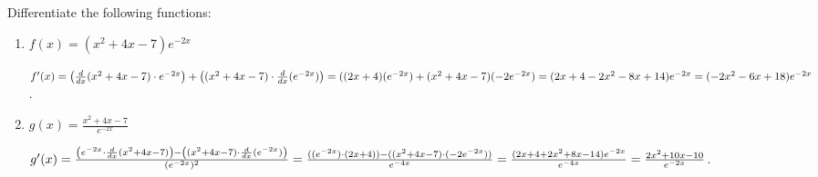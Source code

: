 \documentclass[handout,nooutcomes]{ximera}
\begin{document}
\begin{problem}
Differentiate the following functions:

	\begin{enumerate}
	
	\item  $f(x) = (x^2 + 4x - 7) e^{-2x}$
			\begin{freeResponse}
			$f'(x) = \left( \frac{d}{dx}(x^2 + 4x - 7) \cdot e^{-2x} \right) + \left((x^2 + 4x - 7) \cdot \frac{d}{dx}(e^{-2x}) \right)
			= ((2x+4)(e^{-2x}) + (x^2 + 4x - 7)(-2e^{-2x})
			= (2x + 4 - 2x^2 - 8x + 14)e^{-2x}
			= (-2x^2 - 6x + 18)e^{-2x}$.
			\end{freeResponse}
			
			
			
	\item  $g(x) = \frac{x^2 + 4x - 7}{e^{-2x}}$
			\begin{freeResponse}
			$g'(x) = \frac{\left( e^{-2x} \cdot \frac{d}{dx}(x^2 + 4x - 7) \right) - \left( (x^2 + 4x - 7) \cdot \frac{d}{dx}(e^{-2x}) \right)}{(e^{-2x})^2}
			= \frac{((e^{-2x}) \cdot (2x+4)) - ((x^2 + 4x - 7) \cdot (-2e^{-2x}))}{e^{-4x}}
			= \frac{(2x + 4 + 2x^2 + 8x - 14)e^{-2x}}{e^{-4x}}
			= \frac{2x^2 + 10x - 10}{e^{-2x}}$.
			\end{freeResponse}
			
			
			
			
	\end{enumerate}		
\end{problem}
	
	
	
	
			
			
\end{document}
